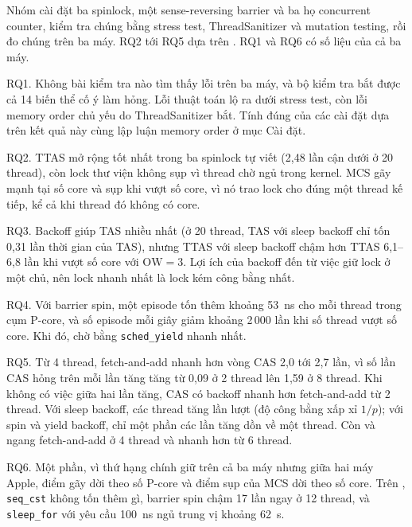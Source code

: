 Nhóm cài đặt ba spinlock, một sense-reversing barrier và ba họ concurrent counter, kiểm tra chúng bằng
stress test, ThreadSanitizer và mutation testing, rồi đo chúng trên ba máy. RQ2 tới RQ5 dựa trên
. RQ1 và RQ6 có số liệu của cả ba máy.

RQ1. Không bài kiểm tra nào tìm thấy lỗi trên ba máy, và bộ kiểm tra bắt được cả 14 biến thể cố ý làm
hỏng. Lỗi thuật toán lộ ra dưới stress test, còn lỗi memory order chủ yếu do ThreadSanitizer bắt.
Tính đúng của các cài đặt dựa trên kết quả này cùng lập luận memory order ở mục Cài đặt.

RQ2. TTAS mở rộng tốt nhất trong ba spinlock tự viết (2,48 lần cận dưới ở 20 thread), còn lock thư viện
không sụp vì thread chờ ngủ trong kernel. MCS gãy mạnh tại số core và sụp khi vượt số core, vì nó trao
lock cho đúng một thread kế tiếp, kể cả khi thread đó không có core.

RQ3. Backoff giúp TAS nhiều nhất (ở 20 thread, TAS với sleep backoff chỉ tốn 0,31 lần thời gian của
TAS), nhưng TTAS với sleep backoff chậm hơn TTAS 6,1--6,8 lần khi vượt số core với $\mathrm{OW} = 3$.
Lợi ích của backoff đến từ việc giữ lock ở một chủ, nên lock nhanh nhất là lock kém công bằng nhất.

RQ4. Với barrier spin, một episode tốn thêm khoảng 53~ns cho mỗi thread trong cụm P-core, và số episode
mỗi giây giảm khoảng 2\,000 lần khi số thread vượt số core. Khi đó, chờ bằng \texttt{sched\_yield}
nhanh nhất.

RQ5. Từ 4 thread, fetch-and-add nhanh hơn vòng CAS 2,0 tới 2,7 lần, vì số lần CAS hỏng trên mỗi lần
tăng tăng từ 0,09 ở 2 thread lên 1,59 ở 8 thread. Khi không có việc giữa hai lần tăng, CAS có backoff
nhanh hơn fetch-and-add từ 2 thread. Với sleep backoff, các thread tăng lần lượt (độ công bằng xấp xỉ
$1/p$); với spin và yield backoff, chỉ một phần các lần tăng dồn về một thread. Còn
 và  ngang fetch-and-add ở 4 thread và nhanh hơn từ 6
thread.

RQ6. Một phần, vì thứ hạng chính giữ trên cả ba máy nhưng giữa hai máy Apple, điểm gãy dời theo số
P-core và điểm sụp của MCS dời theo số core. Trên , \texttt{seq\_cst} không tốn thêm
gì, barrier spin chậm 17 lần ngay ở 12 thread, và \texttt{sleep\_for} với yêu cầu 100~ns ngủ trung vị
khoảng 62~\textmu s.

